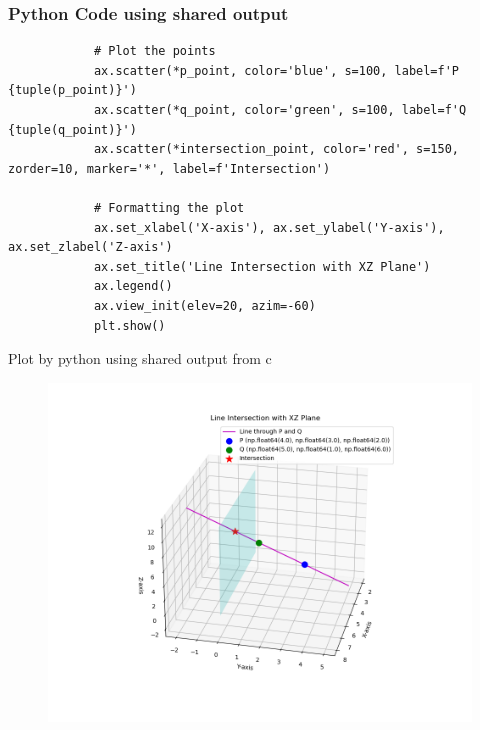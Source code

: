 \documentclass{beamer}
\begin{document}
	\begin{frame}[fragile]
		\frametitle{Python Code using shared output}
		\begin{lstlisting}
			# Plot the points
			ax.scatter(*p_point, color='blue', s=100, label=f'P {tuple(p_point)}')
			ax.scatter(*q_point, color='green', s=100, label=f'Q {tuple(q_point)}')
			ax.scatter(*intersection_point, color='red', s=150, zorder=10, marker='*', label=f'Intersection')
			
			# Formatting the plot
			ax.set_xlabel('X-axis'), ax.set_ylabel('Y-axis'), ax.set_zlabel('Z-axis')
			ax.set_title('Line Intersection with XZ Plane')
			ax.legend()
			ax.view_init(elev=20, azim=-60)
			plt.show()
		\end{lstlisting}
	\end{frame}
	
	
	
	\begin{frame}{Plot by python using shared output from c}
		\begin{center}
			\begin{figure}[H]
				\centering
				\includegraphics[width = 0.8\columnwidth]{figs/Figure_1.png}
				\caption*{}
				\label{}
			\end{figure}
		\end{center}
	\end{frame}
	
	
\end{document}
